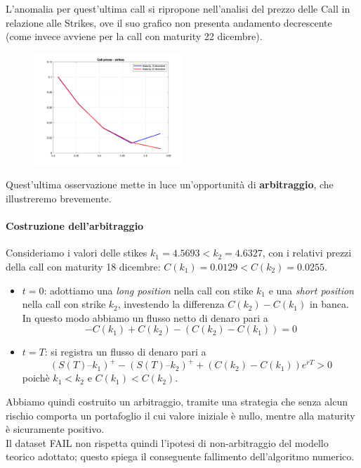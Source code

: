 \documentclass[11pt]{article}
\begin{document}
L’anomalia per quest’ultima call si ripropone nell’analisi del prezzo delle Call in relazione alle Strikes, ove il suo grafico non presenta andamento decrescente (come invece avviene per la call con maturity 22 dicembre). 


\begin{figure}[H]
\centering
\includegraphics[width=0.5\textwidth]{C_K}
\end{figure}

Quest’ultima osservazione mette in luce un’opportunità di \textbf{arbitraggio}, che illustreremo brevemente.\\
\vfill
\paragraph{Costruzione dell'arbitraggio} Consideriamo i valori delle stikes $k_1=4.5693 < k_2=4.6327$, con i relativi prezzi della call con maturity 18 dicembre: $C(k_1)=0.0129 < C(k_2)=0.0255$. \\
\begin{itemize}


\item \textbf{$t=0$}: adottiamo una \textit{long position}  nella call con stike $k_1$ e una \textit{short position} nella call con strike $k_2$, investendo la differenza $C(k_2)-C(k_1)$ in banca.\\ In questo modo abbiamo un flusso netto di denaro pari a $$-C(k_1)+C(k_2)-(C(k_2)-C(k_1))=0$$

\item \textbf{$t=T$}: si registra un flusso di denaro pari a $$(S(T) – k_1)^+ - (S(T) – k_2)^+ + (C(k_2)-C(k_1))e^{rT}> 0 $$ poichè $k_1<k_2$ e $C(k_1)<C(k_2)$. 
\end{itemize}

Abbiamo quindi costruito un arbitraggio, tramite una strategia che senza alcun rischio comporta un portafoglio il cui valore iniziale è nullo, mentre alla maturity è sicuramente positivo.\\
Il dataset FAIL non rispetta quindi l’ipotesi di non-arbitraggio del modello teorico adottato; questo spiega il conseguente fallimento dell’algoritmo numerico.
\end{document}
